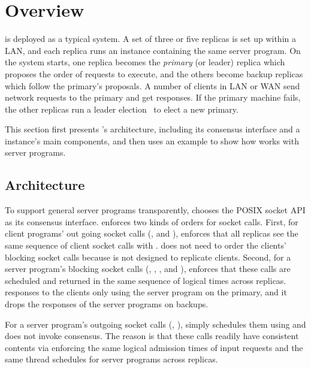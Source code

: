 \section{\xxx Overview} \label{sec:overview}

\xxx is deployed as a typical \smr system. A set of three or five replicas is 
set up within a LAN, and each replica runs an \xxx instance containing the 
same server program. On the \xxx system starts, one replica becomes the 
\emph{primary} (or leader) replica which proposes the order of requests to 
execute, and the others become backup replicas which follow the primary's 
proposals. A number of clients in LAN or WAN send network requests 
to the primary and get responses.  If the primary machine fails, the other 
replicas run a leader election~\cite{paxos:practical} to elect a new primary.

This section first presents \xxx's architecture, including its consensus 
interface and a \xxx instance's main components, and then uses an 
example to show how \xxx works with server programs.


\subsection{Architecture} \label{sec:abstraction}

To support general server programs transparently, \xxx chooses the POSIX socket 
API as its consensus interface. \xxx enforces two kinds of orders for socket
calls. First, for client programs' out going socket calls (\eg, \connect and
\send), \xxx enforces that all replicas see the same sequence of client socket 
calls with \paxos. \xxx does not need to order the clients' 
blocking socket calls because \xxx is not designed to replicate clients. 
Second, for a server program's blocking socket calls (\eg, \poll, \accept, and 
\recv), \xxx enforces that these calls are scheduled and 
returned in the same sequence of logical times across replicas. \xxx 
responses to the clients only using the server program on the primary, and it 
drops the responses of the server programs on backups.

For a server program's outgoing socket calls (\eg, \send), \xxx simply 
schedules them using \dmt and does not invoke consensus. The 
reason is that these calls readily have consistent contents via enforcing 
the same logical admission times of input requests and the same thread 
schedules for server programs across replicas.

